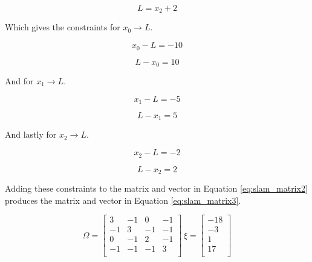 \begin{equation}
\label{eq:slam_lan_rel3}
L = x_2 + 2
\end{equation}

Which gives the constraints for $x_0 \rightarrow L$.

\begin{equation}
\label{eq:slam_lan_cons1_a}
x_0 - L = -10
\end{equation}

\begin{equation}
\label{eq:slam_lan_cons1_b}
L - x_0 = 10
\end{equation}

And for $x_1 \rightarrow L$.

\begin{equation}
\label{eq:slam_lan_cons2_a}
x_1 - L = -5
\end{equation}

\begin{equation}
\label{eq:slam_lan_cons2_b}
L - x_1 = 5
\end{equation}

And lastly for $x_2 \rightarrow L$.

\begin{equation}
\label{eq:slam_lan_cons3_a}
x_2 - L = -2
\end{equation}

\begin{equation}
\label{eq:slam_lan_cons3_b}
L - x_2 = 2
\end{equation}

Adding these constraints to the matrix and vector in Equation \ref{eq:slam_matrix2} produces the matrix and vector in Equation \ref{eq:slam_matrix3}.

\begin{equation}
\Omega =
\label{eq:slam_matrix3}
\begin{bmatrix}
3 & -1 & 0 & -1 \\
-1 & 3 & -1 & -1 \\
0 & -1 & 2 & -1 \\
-1 & -1 & -1 & 3 \\
\end{bmatrix}\,
\xi =
\begin{bmatrix}
-18 \\
-3 \\
1 \\
17 \\
\end{bmatrix}
\end{equation}

